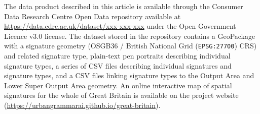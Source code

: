 
The data product described in this article is available through the Consumer Data
Research Centre Open Data repository available at
\hyperlink{https://data.cdrc.ac.uk/dataset/xxx-xxx-xxx}{https://data.cdrc.ac.uk/dataset/xxx-xxx-xxx}
under the Open Government Licence v3.0 license. The dataset stored in the repository
contains a GeoPackage with a signature geometry (OSGB36 / British National Grid
(\texttt{EPSG:27700}) CRS) and related signature type, plain-text pen portraits describing individual
signature types, a series of CSV files describing individual signatures and signature
types, and a CSV files linking signature types to the Output Area and Lower
Super Output Area geometry. An online interactive map
of spatial signatures for the whole of Great Britain is available on the project website
(\hyperlink{https://urbangrammarai.github.io/great-britain}{https://urbangrammarai.github.io/great-britain}).
